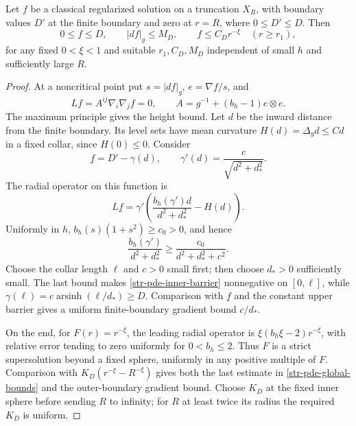 \begin{lemma}
\label{str-pde-global-gradient}
Let $f$ be a classical regularized solution on a truncation $X_R$,
with boundary values $D'$ at the finite boundary and zero at
$r=R$, where $0\leq D'\leq D$. Then
\begin{equation}\label{str-pde-global-bounds}
 0\leq f\leq D,\qquad |df|_g\leq M_D,
 \qquad f\leq C_Dr^{-\xi}\quad(r\geq r_1),
\end{equation}
for any fixed $0<\xi<1$ and suitable $r_1,C_D,M_D$ independent
of small $h$ and sufficiently large $R$.
\end{lemma}
\begin{proof}
At a noncritical point put $s=|df|_g$, $e=\nabla f/s$, and
\[
 Lf=A^{ij}\nabla_i\nabla_jf=0,
 \qquad A=g^{-1}+(b_h-1)e\otimes e.
\]
The maximum principle gives the height bound.
Let $d$ be the inward distance from the finite boundary. Its level
sets have mean curvature $H(d)=\Delta_g d\leq C d$ in a fixed
collar, since $H(0)\leq0$. Consider
\[
 \underline f=D'-\gamma(d),\qquad
 \gamma'(d)=\frac{c}{\sqrt{d^2+d_*^2}}.
\]
The radial operator on this function is
\begin{equation}\label{str-pde-inner-barrier}
 L\underline f
 =\gamma'\left(\frac{b_h(\gamma')d}{d^2+d_*^2}-H(d)\right).
\end{equation}
Uniformly in $h$, $b_h(s)(1+s^2)\geq c_0>0$, and hence
\[
 \frac{b_h(\gamma')}{d^2+d_*^2}
 \geq\frac{c_0}{d^2+d_*^2+c^2}.
\]
Choose the collar length $\ell$ and $c>0$ small first; then choose
$d_*>0$ sufficiently small. The last bound makes
\eqref{str-pde-inner-barrier} nonnegative on $[0,\ell]$, while
$\gamma(\ell)=c\operatorname{arsinh}(\ell/d_*)\geq D$.
Comparison with $\underline f$ and the constant upper barrier
gives a uniform finite-boundary gradient bound $c/d_*$.

On the end, for $F(r)=r^{-\xi}$, the leading radial operator is
$\xi(b_h\xi-2)r^{-\xi}$, with relative error tending to zero
uniformly for $0<b_h\leq2$. Thus $F$ is a strict supersolution
beyond a fixed sphere, uniformly in any positive multiple of $F$.
Comparison with
$K_D(r^{-\xi}-R^{-\xi})$ gives both the last estimate in
\eqref{str-pde-global-bounds} and the outer-boundary gradient
bound. Choose $K_D$ at the fixed inner sphere before sending
$R$ to infinity; for $R$ at least twice its radius the required
$K_D$ is uniform.


\end{proof}

